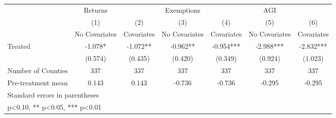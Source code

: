 {
\def\sym#1{\ifmmode^{#1}\else\(^{#1}\)\fi}
\begin{tabular}{l*{6}{c}}
\hline\hline
            &     Returns   &               &  Exemptions   &               &         AGI   &               \\
            &\multicolumn{1}{c}{(1)}&\multicolumn{1}{c}{(2)}&\multicolumn{1}{c}{(3)}&\multicolumn{1}{c}{(4)}&\multicolumn{1}{c}{(5)}&\multicolumn{1}{c}{(6)}\\
            &\multicolumn{1}{c}{No Covariates}&\multicolumn{1}{c}{Covariates}&\multicolumn{1}{c}{No Covariates}&\multicolumn{1}{c}{Covariates}&\multicolumn{1}{c}{No Covariates}&\multicolumn{1}{c}{Covariates}\\
\hline
Treated     &      -1.078*  &      -1.072** &      -0.962** &      -0.954***&      -2.988***&      -2.832***\\
            &     (0.574)   &     (0.435)   &     (0.420)   &     (0.349)   &     (0.924)   &     (1.023)   \\
\hline
Number of Counties&         337   &         337   &         337   &         337   &         337   &         337   \\
Pre-treatment mean&       0.143   &       0.143   &      -0.736   &      -0.736   &      -0.295   &      -0.295   \\
\hline\hline
\multicolumn{7}{l}{\footnotesize Standard errors in parentheses}\\
\multicolumn{7}{l}{\footnotesize * p<0.10, ** p<0.05, *** p<0.01}\\
\end{tabular}
}
